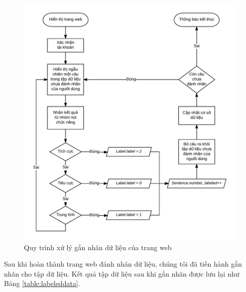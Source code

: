 \begin{figure}[h]
\centering
\includegraphics[scale=0.27]{../hinh/UpdateDatabase.png}
\caption{Quy trình xử lý gắn nhãn dữ liệu của trang web}
\label{fig:updatedb}
\end{figure}

Sau khi hoàn thành trang web đánh nhãn dữ liệu, chúng tôi đã tiến hành gắn nhãn cho tập dữ liệu. Kết quả tập dữ liệu sau khi gắn nhãn được lưu lại như Bảng \ref{table:labeleddata}.



